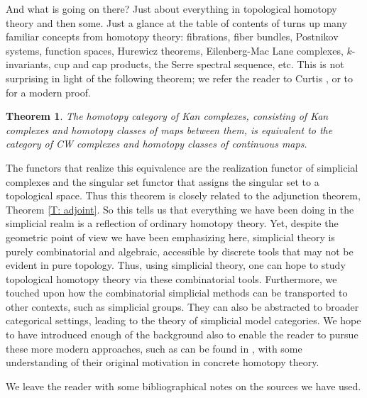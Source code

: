 \documentclass[12pt]{article}
\theoremstyle{plain}
\newtheorem{theorem}{Theorem}[section]
\theoremstyle{definition}
\begin{document}
And what is going on there? Just about everything in topological homotopy theory and then some. Just a glance at the table of contents of \cite{MAY67} turns up many familiar concepts from homotopy theory: fibrations, fiber bundles, Postnikov systems, function spaces, Hurewicz theorems, Eilenberg-Mac Lane complexes, $k$-invariants, cup and cap products, the Serre spectral sequence, etc. This is not surprising in light of the following theorem; we refer the reader to Curtis \cite[Section 12]{Cu71}, or to \cite[Section I.11]{GoeJar} for a modern proof.

\begin{theorem}\label{T: equiv}
The homotopy category of Kan complexes, consisting of Kan complexes and homotopy classes of maps between them, is equivalent to the category of CW complexes and homotopy classes of continuous maps.
\end{theorem}

The functors that realize this equivalence are the realization functor of simplicial complexes and the singular set functor that assigns the singular set to a topological space. Thus this theorem is closely related to the adjunction theorem, Theorem \ref{T: adjoint}. So this tells us that everything we have been doing in the simplicial realm is a reflection of ordinary homotopy theory. Yet, despite the geometric point of view we have been emphasizing here, simplicial theory is purely combinatorial and algebraic, accessible by discrete tools that may not be evident in pure topology. Thus, using simplicial theory, one can hope to study topological homotopy theory via these combinatorial tools. Furthermore, we touched upon how the combinatorial simplicial methods can be transported to other contexts, such as simplicial groups. They can also be abstracted to broader categorical settings, leading to the theory of simplicial model categories. We hope to have introduced enough of the background also to enable the reader to pursue these more modern approaches, such as can be found in \cite{GoeJar}, with some understanding of their original motivation in concrete homotopy theory. 


We leave the reader with some bibliographical notes on the sources we have used. 
\end{document}
